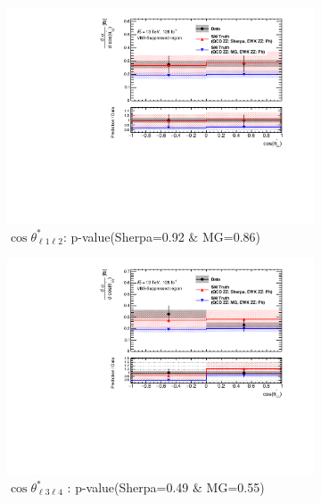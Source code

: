 \begin{figure}[!htb]
    \centering
    \begin{subfigure}{.49\textwidth}
        \centering
        \includegraphics[width=.98\linewidth]{figures/Results/CrossSection_VBSSuppressed/xs_cosThetaStar1_CR.pdf}
        \caption{ \footnotesize{$\cos \theta^{*}_{\ell 1 \ell 2}$}: p-value(Sherpa=0.92 $\&$ MG=0.86)}
    \end{subfigure}
    \begin{subfigure}{.49\textwidth}
        \centering
        \includegraphics[width=.98\linewidth]{figures/Results/CrossSection_VBSSuppressed/xs_cosThetaStar3_CR.pdf}
        \caption{ \footnotesize{$\cos \theta^{*}_{\ell 3 \ell 4}$ }: p-value(Sherpa=0.49 $\&$ MG=0.55)}
    \end{subfigure}\\
    \begin{subfigure}{.49\textwidth}

\end{subfigure}
\end{figure}
